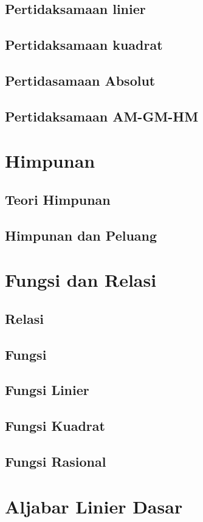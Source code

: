 \documentclass[12pt,a4paper,twoside,openany]{book}
\begin{document}
\section{Pertidaksamaan linier}
\section{Pertidaksamaan kuadrat}
\section{Pertidasamaan Absolut}
\section{Pertidaksamaan AM-GM-HM}

\chapter{Himpunan}
\section{Teori Himpunan}
\section{Himpunan dan Peluang}

\chapter{Fungsi dan Relasi}
\section{Relasi}
\section{Fungsi}
\section{Fungsi Linier}
\section{Fungsi Kuadrat}
\section{Fungsi Rasional}


\chapter{Aljabar Linier Dasar}
\end{document}
